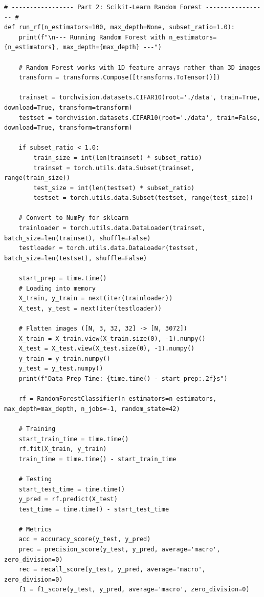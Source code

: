 \documentclass[runningheads]{ctexart}
\begin{document}
\begin{lstlisting}
# ----------------- Part 2: Scikit-Learn Random Forest ----------------- #
def run_rf(n_estimators=100, max_depth=None, subset_ratio=1.0):
    print(f"\n--- Running Random Forest with n_estimators={n_estimators}, max_depth={max_depth} ---")
    
    # Random Forest works with 1D feature arrays rather than 3D images
    transform = transforms.Compose([transforms.ToTensor()])
    
    trainset = torchvision.datasets.CIFAR10(root='./data', train=True, download=True, transform=transform)
    testset = torchvision.datasets.CIFAR10(root='./data', train=False, download=True, transform=transform)

    if subset_ratio < 1.0:
        train_size = int(len(trainset) * subset_ratio)
        trainset = torch.utils.data.Subset(trainset, range(train_size))
        test_size = int(len(testset) * subset_ratio)
        testset = torch.utils.data.Subset(testset, range(test_size))

    # Convert to NumPy for sklearn
    trainloader = torch.utils.data.DataLoader(trainset, batch_size=len(trainset), shuffle=False)
    testloader = torch.utils.data.DataLoader(testset, batch_size=len(testset), shuffle=False)

    start_prep = time.time()
    # Loading into memory
    X_train, y_train = next(iter(trainloader))
    X_test, y_test = next(iter(testloader))
    
    # Flatten images ([N, 3, 32, 32] -> [N, 3072])
    X_train = X_train.view(X_train.size(0), -1).numpy()
    X_test = X_test.view(X_test.size(0), -1).numpy()
    y_train = y_train.numpy()
    y_test = y_test.numpy()
    print(f"Data Prep Time: {time.time() - start_prep:.2f}s")

    rf = RandomForestClassifier(n_estimators=n_estimators, max_depth=max_depth, n_jobs=-1, random_state=42)
    
    # Training
    start_train_time = time.time()
    rf.fit(X_train, y_train)
    train_time = time.time() - start_train_time

    # Testing
    start_test_time = time.time()
    y_pred = rf.predict(X_test)
    test_time = time.time() - start_test_time

    # Metrics
    acc = accuracy_score(y_test, y_pred)
    prec = precision_score(y_test, y_pred, average='macro', zero_division=0)
    rec = recall_score(y_test, y_pred, average='macro', zero_division=0)
    f1 = f1_score(y_test, y_pred, average='macro', zero_division=0)


\end{lstlisting}
\end{document}
